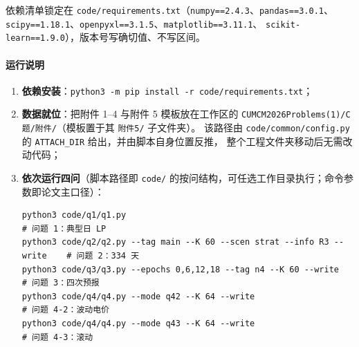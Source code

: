 依赖清单锁定在 \texttt{code/requirements.txt}（\texttt{numpy==2.4.3}、\texttt{pandas==3.0.1}、
\texttt{scipy==1.18.1}、\texttt{openpyxl==3.1.5}、\texttt{matplotlib==3.11.1}、
\texttt{scikit-learn==1.9.0}），版本号写确切值、不写区间。

\paragraph{运行说明}

\begin{enumerate}
  \item \textbf{依赖安装}：\texttt{python3 -m pip install -r code/requirements.txt}；
  \item \textbf{数据就位}：把附件 1--4 与附件 5 模板放在工作区的
        \texttt{CUMCM2026Problems(1)/C题/附件/}（模板置于其 \texttt{附件5/} 子文件夹）。
        该路径由 \texttt{code/common/config.py} 的 \texttt{ATTACH\_DIR} 给出，并由脚本自身位置反推，
        整个工程文件夹移动后无需改动代码；
  \item \textbf{依次运行四问}（脚本路径即 \texttt{code/} 的按问结构，可任选工作目录执行；命令参数即论文主口径）：

\begin{lstlisting}[style=plain]
python3 code/q1/q1.py                                                      # 问题 1：典型日 LP
python3 code/q2/q2.py --tag main --K 60 --scen strat --info R3 --write    # 问题 2：334 天
python3 code/q3/q3.py --epochs 0,6,12,18 --tag n4 --K 60 --write          # 问题 3：四次预报
python3 code/q4/q4.py --mode q42 --K 64 --write                           # 问题 4-2：波动电价
python3 code/q4/q4.py --mode q43 --K 64 --write                           # 问题 4-3：滚动
\end{lstlisting}


\end{enumerate}
